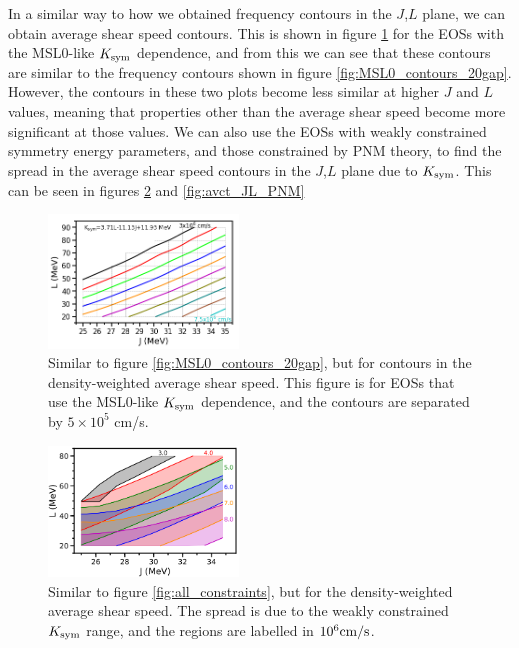 \documentclass[fleqn,usenatbib]{mnras}
\begin{document}
In a similar way to how we obtained frequency contours in the $J$,$L$ plane, we can obtain average shear speed contours. This is shown in figure \ref{fig:avct_JL_MSL0} for the EOSs with the MSL0-like $K_{\rm sym}$ dependence, and from this we can see that these contours are similar to the frequency contours shown in figure \ref{fig:MSL0_contours_20gap}. However, the contours in these two plots become less similar at higher $J$ and $L$ values, meaning that properties other than the average shear speed become more significant at those values. We can also use the EOSs with weakly constrained symmetry energy parameters, and those constrained by PNM theory, to find the spread in the average shear speed contours in the $J$,$L$ plane due to $K_{\rm sym}$. This can be seen in figures \ref{fig:avct_JL_grid} and \ref{fig:avct_JL_PNM}

\begin{figure}
\centering
\includegraphics[width=0.45\textwidth,angle=0]{avct_contours.png}
\caption{Similar to figure \ref{fig:MSL0_contours_20gap}, but for contours in the density-weighted average shear speed. This figure is for EOSs that use the MSL0-like $K_{\rm sym}$ dependence, and the contours are separated by $5\times 10^5$ cm/s.}
\label{fig:avct_JL_MSL0}
\end{figure}

\begin{figure}
\centering
\includegraphics[width=0.45\textwidth,angle=0]{avct_grid_Kspread.png}
\caption{Similar to figure \ref{fig:all_constraints}, but for the density-weighted average shear speed. The spread is due to the weakly constrained $K_{\rm sym}$ range, and the regions are labelled in $10^6 \rm{cm/s}$.}
\label{fig:avct_JL_grid}
\end{figure}
\end{document}
